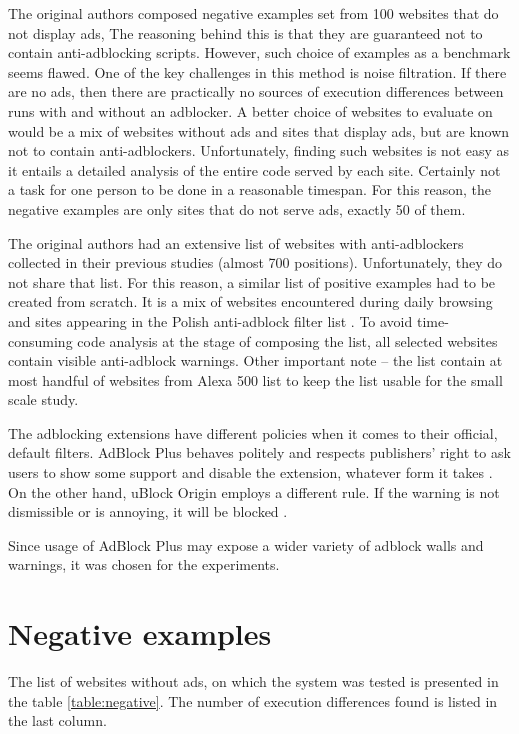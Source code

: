 The original authors composed negative examples set from 100 websites that do not display ads,
The reasoning behind this is that they are guaranteed not to contain anti-adblocking scripts.
However, such choice of examples as a benchmark seems flawed.
One of the key challenges in this method is noise filtration. If there are no ads, 
then there are practically no sources of execution differences between runs with and without an adblocker.
A better choice of websites to evaluate on would be a mix of websites without ads and sites that
display ads, but are known not to contain anti-adblockers.
Unfortunately, finding such websites is not easy as it entails a detailed analysis of the entire code
served by each site. Certainly not a task for one person to be done in a reasonable timespan.
For this reason, the negative examples are only sites that do not serve ads, exactly 50 of them.

The original authors had an extensive list of websites with anti-adblockers collected in their
previous studies (almost 700 positions). Unfortunately, they do not share that list. 
For this reason, a similar list of positive examples had to be created from scratch.
It is a mix of websites encountered during daily browsing and sites appearing in the
Polish anti-adblock filter list \cite{github:anti-adblock-list}.
To avoid time-consuming code analysis at the stage of composing the list, 
all selected websites contain visible anti-adblock warnings.
Other important note -- the list contain at most handful of websites from Alexa 500 list \cite{alexa-list} to keep the list
usable for the small scale study.

The adblocking extensions have different policies when it comes to their official, default filters.
AdBlock Plus behaves politely and respects publishers' right to ask users to show some support
and disable the extension, whatever form it takes \cite{adblock:policy}.
On the other hand, uBlock Origin employs a different rule. If the warning is not dismissible or is annoying,
it will be blocked \cite{vice:ublock-policy}.

Since usage of AdBlock Plus may expose a wider variety of adblock walls and warnings, 
it was chosen for the experiments.

\section{Negative examples}

The list of websites without ads, on which the system was tested is presented in the table \ref{table:negative}.
The number of execution differences found is listed in the last column.


